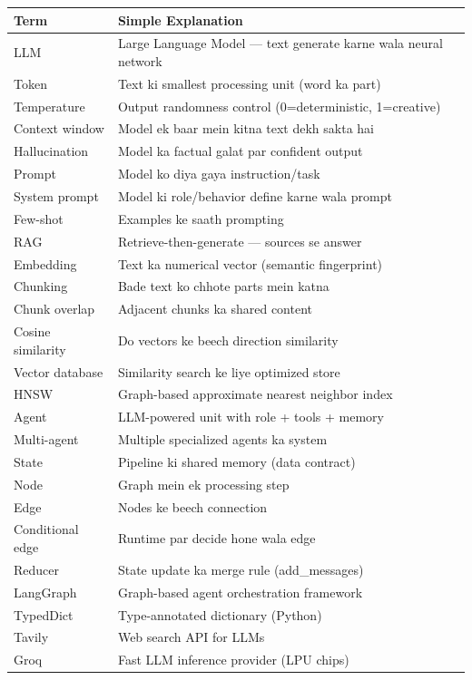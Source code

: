 \begin{longtable}{p{4.5cm} p{9.5cm}}
\toprule
\textbf{Term} & \textbf{Simple Explanation} \\
\midrule
LLM & Large Language Model --- text generate karne wala neural network \\
Token & Text ki smallest processing unit (word ka part) \\
Temperature & Output randomness control (0=deterministic, 1=creative) \\
Context window & Model ek baar mein kitna text dekh sakta hai \\
Hallucination & Model ka factual galat par confident output \\
Prompt & Model ko diya gaya instruction/task \\
System prompt & Model ki role/behavior define karne wala prompt \\
Few-shot & Examples ke saath prompting \\
RAG & Retrieve-then-generate --- sources se answer \\
Embedding & Text ka numerical vector (semantic fingerprint) \\
Chunking & Bade text ko chhote parts mein katna \\
Chunk overlap & Adjacent chunks ka shared content \\
Cosine similarity & Do vectors ke beech direction similarity \\
Vector database & Similarity search ke liye optimized store \\
HNSW & Graph-based approximate nearest neighbor index \\
Agent & LLM-powered unit with role + tools + memory \\
Multi-agent & Multiple specialized agents ka system \\
State & Pipeline ki shared memory (data contract) \\
Node & Graph mein ek processing step \\
Edge & Nodes ke beech connection \\
Conditional edge & Runtime par decide hone wala edge \\
Reducer & State update ka merge rule (add\_messages) \\
LangGraph & Graph-based agent orchestration framework \\
TypedDict & Type-annotated dictionary (Python) \\
Tavily & Web search API for LLMs \\
Groq & Fast LLM inference provider (LPU chips) \\

\end{longtable}
